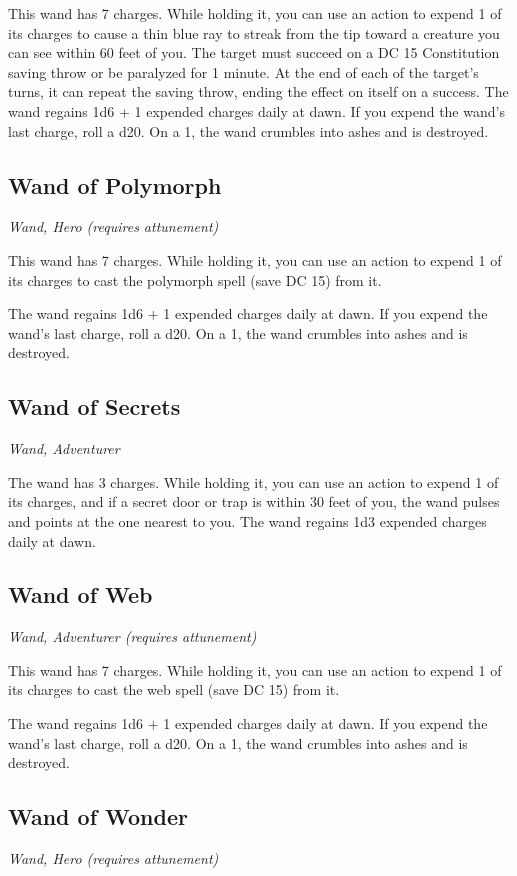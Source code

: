 This wand has 7 charges. While holding it, you can use an action to expend 1 of its charges to cause a thin blue ray to streak from the tip toward a creature you can see within 60 feet of you. The target must succeed on a DC 15 Constitution saving throw or be paralyzed for 1 minute. At the end of each of the target's turns, it can repeat the saving throw, ending the effect on itself on a success.  The wand regains 1d6 + 1 expended charges daily at dawn. If you expend the wand's last charge, roll a d20. On a 1, the wand crumbles into ashes and is destroyed.

\subsection{Wand of Polymorph}
\textit{Wand, Hero (requires attunement)}

This wand has 7 charges. While holding it, you can use an action to expend 1 of its charges to cast the polymorph spell (save DC 15) from it.

The wand regains 1d6 + 1 expended charges daily at dawn. If you expend the wand's last charge, roll a d20. On a 1, the wand crumbles into ashes and is destroyed.

\subsection{Wand of Secrets}
\textit{Wand, Adventurer}

The wand has 3 charges. While holding it, you can use an action to expend 1 of its charges, and if a secret door or trap is within 30 feet of you, the wand pulses and points at the one nearest to you. The wand regains 1d3 expended charges daily at dawn.

\subsection{Wand of Web}
\textit{Wand, Adventurer (requires attunement)}

This wand has 7 charges. While holding it, you can use an action to expend 1 of its charges to cast the web spell (save DC 15) from it.

The wand regains 1d6 + 1 expended charges daily at dawn. If you expend the wand's last charge, roll a d20. On a 1, the wand crumbles into ashes and is destroyed.

\subsection{Wand of Wonder}
\textit{Wand, Hero (requires attunement)}

